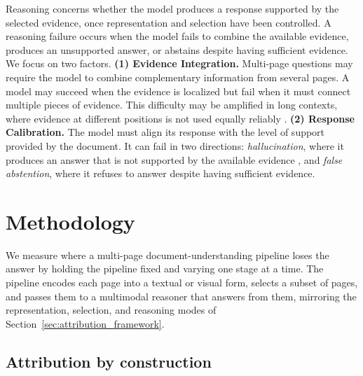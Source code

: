 \documentclass[11pt]{article}
\begin{document}
Reasoning concerns whether the model produces a response supported by the selected evidence, once representation and selection have been controlled. A reasoning failure occurs when the model fails to combine the available evidence, produces an unsupported answer, or abstains despite having sufficient evidence. We focus on two factors.
\textbf{(1) Evidence Integration.} Multi-page questions may require the model to combine complementary information from several pages. A model
may succeed when the evidence is localized but fail when it must connect multiple pieces of evidence. This difficulty may be amplified in long contexts, where evidence at different positions is not used equally
reliably \citep{liu2024lost}.
\textbf{(2) Response Calibration.} The model must align its response with the level of support provided by the document. It can fail in two directions: \emph{hallucination}, where it produces an answer that is not supported by the available evidence \citep{li2023llmattribution}, and \emph{false abstention}, where it refuses to answer despite having sufficient evidence.




\section{Methodology}
\label{sec:methodology}

We measure where a multi-page document-understanding pipeline loses the answer by holding the pipeline fixed and varying one stage at a time. The pipeline encodes each page into a textual or visual form, selects a subset of pages, and passes them to a multimodal reasoner that answers from them, mirroring the representation, selection, and reasoning modes of Section~\ref{sec:attribution_framework}.

\subsection{Attribution by construction}
\label{subsec:isolation}
\end{document}

